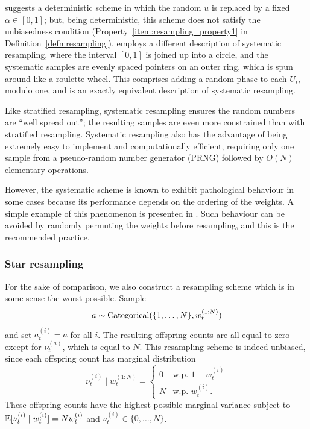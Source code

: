 \textcite{kitagawa1996} suggests a deterministic scheme in which the random $u$ is replaced by a fixed $\alpha\in[0,1]$; but, being deterministic, this scheme does not satisfy the unbiasedness condition (Property~\ref{item:resampling_property1} in Definition~\ref{defn:resampling}).
\textcite{whitley1994} employs a different description of systematic resampling, where the interval $[0,1]$ is joined up into a circle, and the systematic samples are evenly spaced pointers on an outer ring, which is spun around like a roulette wheel. This comprises adding a random phase to each $U_i$, modulo one, and is an exactly equivalent description of systematic resampling.

Like stratified resampling, systematic resampling ensures the random numbers are ``well spread out''; the resulting samples are even more constrained than with stratified resampling. 
Systematic resampling also has the advantage of being extremely easy to implement and computationally efficient, requiring only one sample from a pseudo-random number generator (PRNG) followed by $O(N)$ elementary operations.

However, the systematic scheme is known to exhibit pathological behaviour in some cases because its performance depends on the ordering of the weights. A simple example of this phenomenon is presented in \textcite{douc2005}. 
Such behaviour can be avoided by randomly permuting the weights before resampling, and this is the recommended practice. 



\subsubsection{Star resampling}
For the sake of comparison, we also construct a resampling scheme which is in some sense the worst possible.
Sample
\begin{equation*}
a \sim \operatorname{Categorical}( \{1,\dots, N\}, w_t^{(1:N)} )
\end{equation*}
and set $a_t^{(i)} = a$ for all $i$.
The resulting offspring counts are all equal to zero except for $\nu_t^{(a)}$, which is equal to $N$.
This resampling scheme is indeed unbiased, since each offspring count has marginal distribution
\begin{equation*}
\nu_t^{(i)}  \mid w_t^{(1:N)} 
= \begin{cases}
0 & \text{w.p. } 1-w_t^{(i)} \\
N & \text{w.p. } w_t^{(i)} .
\end{cases}
\end{equation*}
These offspring counts have the highest possible marginal variance subject to $\mathbb{E}[ \nu_t^{(i)}  \mid w_t^{(i)} ] = Nw_t^{(i)}$ and $\nu_t^{(i)} \in \{0,\dots,N\}$.

